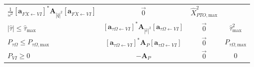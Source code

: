 \documentclass[a4paper,fleqn,colorlinks,unicode,lineno]{cas-dc} %
\makeatletter
\providecommand{\DIFaddtex}[1]{{\protect\color{blue}\uwave{#1}}} %
\providecommand{\DIFdeltex}[1]{{\protect\color{red}\sout{#1}}} %
\providecommand{\DIFaddFL}[1]{\DIFadd{#1}} %
\providecommand{\DIFdelFL}[1]{\DIFdel{#1}} %
\providecommand{\DIFaddbeginFL}{} %
\providecommand{\DIFaddendFL}{} %
\providecommand{\DIFdelbeginFL}{} %
\providecommand{\DIFdelendFL}{} %
\providecommand{\DIFadd}[1]{\texorpdfstring{\DIFaddtex{#1}}{#1}} %
\providecommand{\DIFdel}[1]{\texorpdfstring{\DIFdeltex{#1}}{}} %
\providecommand{\DIFscaledelfig}{0.5}
\newlength{\DIFdelgraphicswidth} %
\newlength{\DIFdelgraphicsheight} %
\providecommand{\DIFaddincludegraphics}[2][]{{\color{blue}\fbox{\DIFOincludegraphics[#1]{#2}}}} %
\providecommand{\DIFdelincludegraphics}[2][]{%
\sbox{\DIFdelgraphicsbox}{\DIFOincludegraphics[#1]{#2}}%
\settoboxwidth{\DIFdelgraphicswidth}{\DIFdelgraphicsbox} %
\settoboxtotalheight{\DIFdelgraphicsheight}{\DIFdelgraphicsbox} %
\scalebox{\DIFscaledelfig}{%
\parbox[b]{\DIFdelgraphicswidth}{\usebox{\DIFdelgraphicsbox}\\[-\baselineskip] \rule{\DIFdelgraphicswidth}{0em}}\llap{\resizebox{\DIFdelgraphicswidth}{\DIFdelgraphicsheight}{%
\setlength{\unitlength}{\DIFdelgraphicswidth}%
\begin{picture}(1,1)%
\thicklines\linethickness{2pt} %
{\color[rgb]{1,0,0}\put(0,0){\framebox(1,1){}}}%
{\color[rgb]{1,0,0}\put(0,0){\line( 1,1){1}}}%
{\color[rgb]{1,0,0}\put(0,1){\line(1,-1){1}}}%
\end{picture}%
}\hspace*{3pt}}} %
} %
\DeclareRobustCommand{\DIFaddbeginFL}{\DIFOaddbeginFL \let\includegraphics\DIFaddincludegraphics} %
\DeclareRobustCommand{\DIFaddendFL}{\DIFOaddendFL \let\includegraphics\DIFOincludegraphics} %
\DeclareRobustCommand{\DIFdelbeginFL}{\DIFOdelbeginFL \let\includegraphics\DIFdelincludegraphics} %
\DeclareRobustCommand{\DIFdelendFL}{\DIFOaddendFL \let\includegraphics\DIFOincludegraphics} %
\let\sout@orig\sout %
\renewcommand{\sout}[1]{\ifmmode\text{\sout@orig{\ensuremath{#1}}}\else\sout@orig{#1}\fi} %
\makeatother
\begin{document}
\begin{table}[b!]
\begin{tabular}{lccc}
        \DIFdelbeginFL \DIFdelFL{$\frac{1}{\omega^2}
        [\mathbf{a}_{F\dot{X}\leftarrow VI}]^* 
        \mathbf{A}_{|\hat{q}|^2}
        [\mathbf{a}_{F\dot{X}\leftarrow VI}]$ }\DIFdelendFL \DIFaddbeginFL \DIFaddFL{$\frac{1}{\gls{sym-omega}^2}
        [\gls{sym-mathbf-a-F-dot-X-leftarrow-VI}]^*
        \gls{sym-mathbf-Q-hat-q-2}
        [\gls{sym-mathbf-a-F-dot-X-leftarrow-VI}]$ }\DIFaddendFL &
        \DIFdelbeginFL \DIFdelFL{$\vec{0}$ }\DIFdelendFL \DIFaddbeginFL \DIFaddFL{$\gls{sym-vec-zero}$ }\DIFaddendFL & \DIFdelbeginFL \DIFdelFL{$\hat{X}_{PTO,\text{max}}^2$ }\DIFdelendFL \DIFaddbeginFL \DIFaddFL{$\gls{sym-X-PTO-max}^2$ }\DIFaddendFL \\
    \DIFdelbeginFL \DIFdelFL{$|\hat{\tau}| \leq \hat{\tau}_{\text{max}}$ }\DIFdelendFL \DIFaddbeginFL \DIFaddFL{$|\gls{sym-hat-tau}| \leq \gls{sym-tau-max}$ }\DIFaddendFL &
        \DIFdelbeginFL \DIFdelFL{$[\mathbf{a}_{\tau\Omega \leftarrow VI}]^* 
        \mathbf{A}_{|\hat{e}|^2}
        [\mathbf{a}_{\tau\Omega\leftarrow VI}]$ }\DIFdelendFL \DIFaddbeginFL \DIFaddFL{$[\gls{sym-mathbf-a-tau-Omega-leftarrow-VI}]^*
        \gls{sym-mathbf-Q-hat-e-2}
        [\gls{sym-mathbf-a-tau-Omega-leftarrow-VI}]$ }\DIFaddendFL &
        \DIFdelbeginFL \DIFdelFL{$\vec{0}$ }\DIFdelendFL \DIFaddbeginFL \DIFaddFL{$\gls{sym-vec-zero}$ }\DIFaddendFL & \DIFdelbeginFL \DIFdelFL{$\hat{\tau}_{\text{max}}^2$ }\DIFdelendFL \DIFaddbeginFL \DIFaddFL{$\gls{sym-tau-max}^2$ }\DIFaddendFL \\
    \DIFdelbeginFL \DIFdelFL{$P_{\tau\Omega} \leq P_{\tau\Omega,\text{max}}$ }\DIFdelendFL \DIFaddbeginFL \DIFaddFL{$\gls{sym-P-tau-Omega} \leq \gls{sym-P-tau-Omega-max}$ }\DIFaddendFL &
        \DIFdelbeginFL \DIFdelFL{$[\mathbf{a}_{\tau\Omega \leftarrow VI}]^* 
        \mathbf{A}_{P}
        [\mathbf{a}_{\tau\Omega\leftarrow VI}]$ }\DIFdelendFL \DIFaddbeginFL \DIFaddFL{$[\gls{sym-mathbf-a-tau-Omega-leftarrow-VI}]^*
        \gls{sym-mathbf-Q-P}
        [\gls{sym-mathbf-a-tau-Omega-leftarrow-VI}]$ }\DIFaddendFL &
        \DIFdelbeginFL \DIFdelFL{$\vec{0}$ }\DIFdelendFL \DIFaddbeginFL \DIFaddFL{$\gls{sym-vec-zero}$ }\DIFaddendFL & \DIFdelbeginFL \DIFdelFL{$P_{\tau\Omega,\text{max}}$ }\DIFdelendFL \DIFaddbeginFL \DIFaddFL{$\gls{sym-P-tau-Omega-max}$ }\DIFaddendFL \\
    \DIFdelbeginFL \DIFdelFL{$P_{VI} \geq 0$ }\DIFdelendFL \DIFaddbeginFL \DIFaddFL{$\gls{sym-P-VI} \geq 0$ }\DIFaddendFL &
        \DIFdelbeginFL \DIFdelFL{$-\mathbf{A}_{P}$ }\DIFdelendFL \DIFaddbeginFL \DIFaddFL{$-\gls{sym-mathbf-Q-P}$ }\DIFaddendFL &
        \DIFdelbeginFL \DIFdelFL{$\vec{0}$ }\DIFdelendFL \DIFaddbeginFL \DIFaddFL{$\gls{sym-vec-zero}$ }\DIFaddendFL & $0$ \\
\end{tabular}
\end{table}
\end{document}

